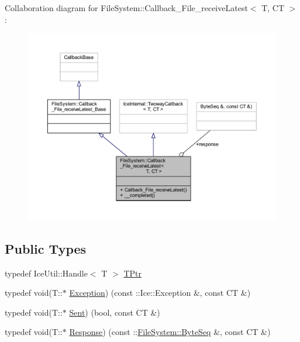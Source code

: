 Collaboration diagram for File\+System\+:\+:Callback\+\_\+\+File\+\_\+receive\+Latest$<$ T, C\+T $>$\+:
\nopagebreak
\begin{figure}[H]
\begin{center}
\leavevmode
\includegraphics[width=350pt]{class_file_system_1_1_callback___file__receive_latest__coll__graph}
\end{center}
\end{figure}
\subsection*{Public Types}
\begin{DoxyCompactItemize}
\item 
typedef Ice\+Util\+::\+Handle$<$ T $>$ \hyperlink{class_file_system_1_1_callback___file__receive_latest_a8e2064ea01933278c4d3a63cb101d0ce}{T\+Ptr}
\item 
typedef void(T\+::$\ast$ \hyperlink{class_file_system_1_1_callback___file__receive_latest_acc747c11c007fbee3d60c5d85affbe4e}{Exception}) (const \+::Ice\+::\+Exception \&, const C\+T \&)
\item 
typedef void(T\+::$\ast$ \hyperlink{class_file_system_1_1_callback___file__receive_latest_a3a1aaa5cad2e6bb47fd5706274b3afa3}{Sent}) (bool, const C\+T \&)
\item 
typedef void(T\+::$\ast$ \hyperlink{class_file_system_1_1_callback___file__receive_latest_a5bf96c59afd76cc204ef4d42fa6527af}{Response}) (const \+::\hyperlink{namespace_file_system_a5c85de065f9c451ae1d1dea2dacb68c5}{File\+System\+::\+Byte\+Seq} \&, const C\+T \&)
\end{DoxyCompactItemize}
